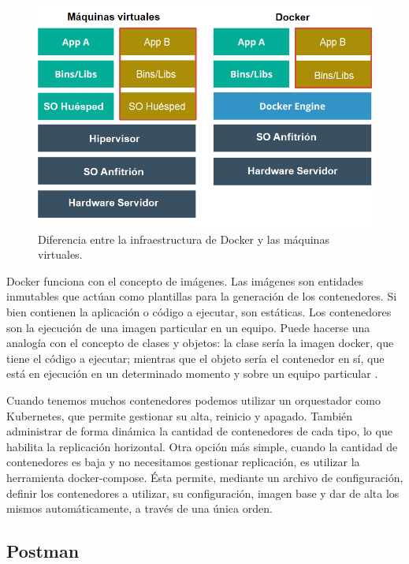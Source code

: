 \begin{figure}[ht]
	\centering
	\includegraphics[width=1\textwidth]{./Figures/dockerVMs.png}
	\caption{Diferencia entre la infraestructura de Docker y las máquinas virtuales.}
	\label{fig:dockerVMs}
\end{figure} 

Docker funciona con el concepto de imágenes. Las imágenes son entidades inmutables que actúan como plantillas para la generación de los contenedores. Si bien contienen la aplicación o código a ejecutar, son estáticas. Los contenedores son la ejecución de una imagen particular en un equipo. Puede hacerse una analogía con el concepto de clases y objetos: la clase sería la imagen docker, que tiene el código a ejecutar; mientras que el objeto sería el contenedor en sí, que está en ejecución en un determinado momento y sobre un equipo particular \citep{WEBSITE:dockerredes}.

Cuando tenemos muchos contenedores podemos utilizar un orquestador como Kubernetes, que permite gestionar su alta, reinicio y apagado. También administrar de forma dinámica la cantidad de contenedores de cada tipo, lo que habilita la replicación horizontal. Otra opción más simple, cuando la cantidad de contenedores es baja y no necesitamos gestionar replicación, es utilizar la herramienta docker-compose. Ésta permite, mediante un archivo de configuración, definir los contenedores a utilizar, su configuración, imagen base y dar de alta los mismos automáticamente, a través de una única orden.

\pagebreak
\subsection{Postman}

